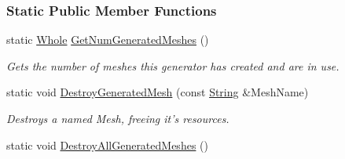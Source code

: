 \subsubsection*{Static Public Member Functions}
\begin{DoxyCompactItemize}
\item 
static \hyperlink{namespacephys_a460f6bc24c8dd347b05e0366ae34f34a}{Whole} \hyperlink{classphys_1_1MeshGenerator_a4ebb68b11fb56a73a2f196303e1059aa}{GetNumGeneratedMeshes} ()
\begin{DoxyCompactList}\small\item\em Gets the number of meshes this generator has created and are in use. \item\end{DoxyCompactList}\item 
static void \hyperlink{classphys_1_1MeshGenerator_afb2061375887b4e4a4ab387806ea69e2}{DestroyGeneratedMesh} (const \hyperlink{namespacephys_aa03900411993de7fbfec4789bc1d392e}{String} \&MeshName)
\begin{DoxyCompactList}\small\item\em Destroys a named Mesh, freeing it's resources. \item\end{DoxyCompactList}\item 
\hypertarget{classphys_1_1MeshGenerator_a7bc0a9b527251b8273b9da6772cc83c3}{
static void \hyperlink{classphys_1_1MeshGenerator_a7bc0a9b527251b8273b9da6772cc83c3}{DestroyAllGeneratedMeshes} ()}
\label{df/d6e/classphys_1_1MeshGenerator_a7bc0a9b527251b8273b9da6772cc83c3}


\end{DoxyCompactItemize}
